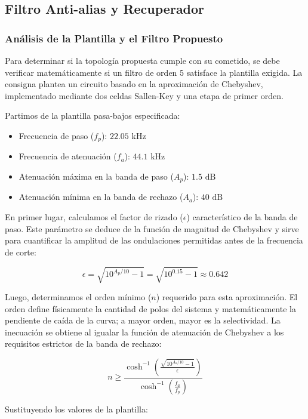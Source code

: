 \subsection{Filtro Anti-alias y Recuperador}
\subsubsection{Análisis de la Plantilla y el Filtro Propuesto}
Para determinar si la topología propuesta cumple con su cometido, se debe verificar matemáticamente si un filtro de orden 5 satisface la plantilla exigida. La consigna plantea un circuito basado en la aproximación de Chebyshev, implementado mediante dos celdas Sallen-Key y una etapa de primer orden.

Partimos de la plantilla pasa-bajos especificada:
\begin{itemize}
	\item Frecuencia de paso ($f_p$): $22.05\text{ kHz}$
	\item Frecuencia de atenuación ($f_a$): $44.1\text{ kHz}$
	\item Atenuación máxima en la banda de paso ($A_p$): $1.5\text{ dB}$
	\item Atenuación mínima en la banda de rechazo ($A_a$): $40\text{ dB}$
\end{itemize}

En primer lugar, calculamos el factor de rizado ($\epsilon$) característico de la banda de paso. Este parámetro se deduce de la función de magnitud de Chebyshev y sirve para cuantificar la amplitud de las ondulaciones permitidas antes de la frecuencia de corte:

\begin{equation}
	\epsilon = \sqrt{10^{A_p/10} - 1} = \sqrt{10^{0.15} - 1} \approx 0.642
\end{equation}

Luego, determinamos el orden mínimo ($n$) requerido para esta aproximación. El orden define físicamente la cantidad de polos del sistema y matemáticamente la pendiente de caída de la curva; a mayor orden, mayor es la selectividad. La inecuación se obtiene al igualar la función de atenuación de Chebyshev a los requisitos estrictos de la banda de rechazo:

\begin{equation}
	n \ge \frac{\cosh^{-1}\left(\frac{\sqrt{10^{A_a/10}-1}}{\epsilon}\right)}{\cosh^{-1}\left(\frac{f_a}{f_p}\right)}
\end{equation}

Sustituyendo los valores de la plantilla:

